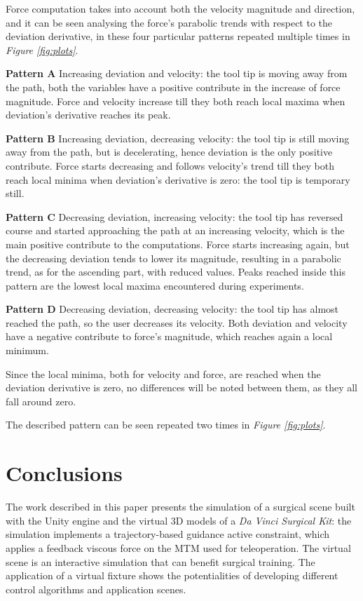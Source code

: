 \documentclass[conference]{IEEEtran}
\begin{document}
Force computation takes into account both the velocity magnitude and direction, and it can be seen analysing the force’s parabolic trends with respect to the deviation derivative, in these four particular patterns repeated multiple times in \textit{Figure \ref{fig:plots}}.

\textbf{Pattern A  } Increasing deviation and velocity: the tool tip is moving away from the path, both the variables have a positive contribute in the increase of force magnitude. Force and velocity increase till they both reach local maxima when deviation’s derivative reaches its peak.

\textbf{Pattern B }  Increasing deviation, decreasing velocity: the tool tip is still moving away from the path, but is decelerating, hence deviation is the only positive contribute. Force starts decreasing and follows velocity’s trend till they both reach local minima when deviation’s derivative is zero: the tool tip is temporary still.

\textbf{Pattern C } Decreasing deviation, increasing velocity: the tool tip has reversed course and started approaching the path at an increasing velocity, which is the main positive contribute to the computations. Force starts increasing again, but the decreasing deviation tends to lower its magnitude, resulting in a parabolic trend, as for the ascending part, with reduced values. Peaks reached inside this pattern are the lowest local maxima encountered during experiments.

\textbf{Pattern D }  Decreasing deviation, decreasing velocity: the tool tip has almost reached the path, so the user decreases its velocity. Both deviation and velocity have a negative contribute to force’s magnitude, which reaches again a local minimum. 




Since the local minima, both for velocity and force, are reached when the deviation derivative is zero, no differences will be noted between them, as they all fall around zero.

The described pattern can be seen repeated two times in \textit{Figure \ref{fig:plots}}.

\section{Conclusions}
    The work described in this paper presents the simulation of a surgical scene built with the Unity engine and the virtual 3D models of a \textit{Da Vinci Surgical Kit}: the simulation implements a trajectory-based guidance active constraint, which applies a feedback viscous force on the MTM used for teleoperation.
    The virtual scene is an interactive simulation that can benefit
    surgical training. The application of a virtual fixture shows
    the potentialities of developing different control algorithms
    and application scenes.



\end{document}
